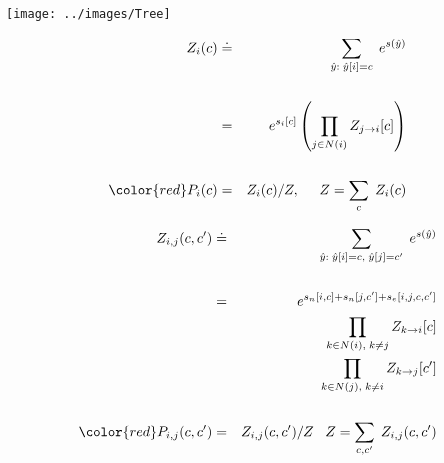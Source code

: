 {

\centerline{\texttt{[image: ../images/Tree]}}

\begin{eqnarray*}
Z_i(c) & \doteq & \sum_{\hat{y}:\; \hat{y}[i] = c} \;e^{s(\hat{y})} \\
\\
& = & e^{s_i[c]} \left(\prod_{j\in N(i)} Z_{j \rightarrow i}[c]\right) \\
\\
{\color{red} P_i(c)} & = & Z_i(c)/Z,\;\;\;\;\; Z = \sum_{c}\;Z_i(c)
\end{eqnarray*}



\begin{eqnarray*}
Z_{i,j}(c,c') & \doteq & \sum_{\hat{y}:\; \hat{y}[i] = c,\;\hat{y}[j] = c'} \;e^{s(\hat{y})} \\
\\
& = & e^{s_n[i,c] + s_n[j,c'] +s_e[i,j,c,c']} \\
& & \prod_{k\in N(i),\;k \not = j} Z_{k \rightarrow i}[c] \\
& & \prod_{k\in N(j),\;k \not = i} Z_{k \rightarrow j}[c'] \\
\\
{\color{red} P_{i,j}(c,c')} & = & Z_{i,j}(c,c')/Z\;\;\;Z = \sum_{c,c'}\;Z_{i,j}(c,c')
\end{eqnarray*}


}


